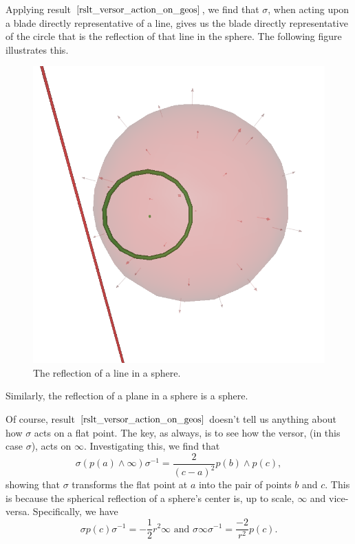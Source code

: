 \documentclass[12pt]{article}
\newcommand{\nvai}{\infty}
\begin{document}
Applying result $\eqref{rslt_versor_action_on_geos}$, we find that $\sigma$, when
acting upon a blade directly representative of a line, gives us the blade directly
representative of the circle that is the reflection of that line in the sphere.
The following figure illustrates this.
\begin{figure}[H]
\centering
\includegraphics[scale=0.3]{ReflectionOfLineInSphereFigure}
\caption{The reflection of a line in a sphere.}
\label{fig_sph_ref_of_line}
\end{figure}
Similarly, the reflection of a plane in a sphere is a sphere.

Of course, result $\eqref{rslt_versor_action_on_geos}$ doesn't tell us anything about
how $\sigma$ acts on a flat point.  The key, as always, is to see how the versor, (in this case $\sigma$), acts on $\nvai$.
Investigating this, we find that
\begin{equation*}
\sigma(p(a)\wedge\nvai)\sigma^{-1} = \frac{2}{(c-a)^2}p(b)\wedge p(c),
\end{equation*}
showing that $\sigma$ transforms the flat point at $a$ into the pair of points $b$ and $c$.
This is because the spherical reflection of a sphere's center is, up to scale, $\nvai$ and vice-versa.
Specifically, we have
\begin{equation*}
\mbox{$\sigma p(c)\sigma^{-1}=-\frac{1}{2}r^2\nvai$ and $\sigma\nvai\sigma^{-1}=\frac{-2}{r^2}p(c)$.}
\end{equation*}
\end{document}
